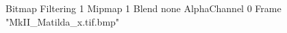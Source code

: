 {Bitmap
	{Filtering 1}
	{Mipmap 1}
	{Blend none}
	{AlphaChannel 0}
	{Frame "MkII_Matilda_x.tif.bmp"}
}
